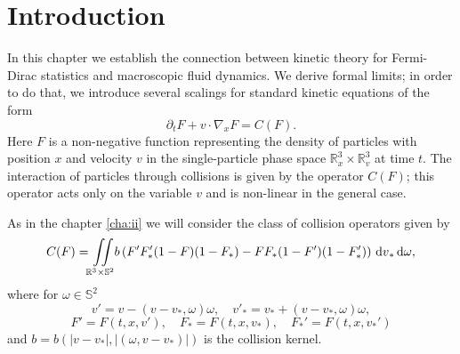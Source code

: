 
\section[Introduction]{Introduction}
In this chapter we establish the connection between kinetic theory for Fermi-Dirac statistics and macroscopic fluid dynamics. We derive formal limits; in order to do that, we introduce several scalings for standard kinetic equations of the form
\begin{equation}\label{eq:unscaled}
\partial_t F  +v\cdot \nabla_xF  =
C(F ).
\end{equation}
Here $F $ is a non-negative function representing the density of particles with position $x$ and velocity $v$ in the single-particle phase space $\mathbb R^3_x\times\mathbb R^3_v$ at time $t$. The interaction of particles through collisions is given by the operator $C(F)$; this operator acts only on the variable $v$ and is non-linear in the general case.

As in the chapter \ref{cha:ii} we will consider the class of collision operators given by %
\begin{equation*}%
C(F) = \col b\left(F'F'_\ast(1-F)(1-F_\ast)-FF_\ast(1-F')(1-F'_\ast)\right) \dv_\ast \dom,
\end{equation*}
where for $\omega \in\mathbb S^2$ \[v' = v- (v-v_\ast,\omega)\omega,\quad v'_\ast= v_\ast+ (v-v_\ast,\omega)\omega,\]
\[F'=F(t,x,v'), \quad F_\ast=F(t,x,v_\ast),\quad F_\ast'=F(t,x,v_\ast')\]
and $b=b(|v-v_\ast|,|(\omega,v-v_\ast)|)$ is the collision kernel. 

